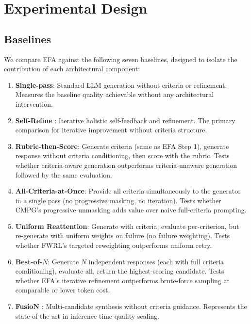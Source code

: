 \documentclass[11pt]{article}
\newcommand{\efa}{\textsc{EFA}}  %
\newcommand{\cmpg}{\textsc{CMPG}}
\newcommand{\fwrl}{\textsc{FWRL}}
\begin{document}
\section{Experimental Design}
\label{sec:experiments}

\subsection{Baselines}

We compare \efa{} against the following seven baselines, designed to isolate the contribution of each architectural component:

\begin{enumerate}[leftmargin=*]
    \item \textbf{Single-pass}: Standard LLM generation without criteria or refinement. Measures the baseline quality achievable without any architectural intervention.
    \item \textbf{Self-Refine} \citep{madaan2023selfrefine}: Iterative holistic self-feedback and refinement. The primary comparison for iterative improvement without criteria structure.
    \item \textbf{Rubric-then-Score}: Generate criteria (same as \efa{} Step 1), generate response without criteria conditioning, then score with the rubric. Tests whether criteria-aware generation outperforms criteria-unaware generation followed by the same evaluation.
    \item \textbf{All-Criteria-at-Once}: Provide all criteria simultaneously to the generator in a single pass (no progressive masking, no iteration). Tests whether \cmpg{}'s progressive unmasking adds value over naive full-criteria prompting.
    \item \textbf{Uniform Reattention}: Generate with criteria, evaluate per-criterion, but re-generate with uniform weights on failure (no failure weighting). Tests whether \fwrl{}'s targeted reweighting outperforms uniform retry.
    \item \textbf{Best-of-$N$}: Generate $N$ independent responses (each with full criteria conditioning), evaluate all, return the highest-scoring candidate. Tests whether \efa{}'s iterative refinement outperforms brute-force sampling at comparable or lower token cost.
    \item \textbf{FusioN} \citep{agarwal2025fusion}: Multi-candidate synthesis without criteria guidance. Represents the state-of-the-art in inference-time quality scaling.
\end{enumerate}
\end{document}
